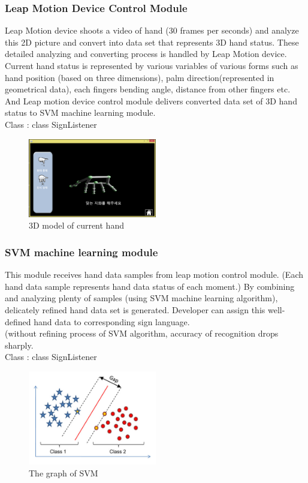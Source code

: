 \documentclass[10pt,journal,compsoc]{IEEEtran}
\begin{document}
\subsubsection{Leap Motion Device Control Module\\}

Leap Motion device shoots a video of hand (30 frames per seconds) and analyze this 2D picture and convert into data set that represents 3D hand status. These detailed analyzing and converting process is handled by Leap Motion device.
Current hand status is represented by various variables of various forms such as hand position (based on three dimensions), palm direction(represented in geometrical data), each fingers bending angle, distance from other fingers etc.
\\And Leap motion device control module delivers converted data set of 3D hand status to SVM machine learning module.
\\Class : class SignListener

\begin{figure}[H]
\centering
\includegraphics[width=0.5\textwidth]{cap_tutorial.png}
{\caption*{3D model of current hand}}
\end{figure}
\subsubsection{SVM machine learning module\\}

This module receives hand data samples from leap motion control module. (Each hand data sample represents hand data status of each moment.) By combining and analyzing plenty of samples (using SVM machine learning algorithm), delicately refined hand data set is generated. Developer can assign this well-defined hand data to corresponding sign language.
\\(without refining process of SVM algorithm, accuracy of recognition drops sharply.
\\Class : class SignListener

\begin{figure}[H]
\centering
\includegraphics[width=0.5\textwidth]{SVM.jpg}
{\caption*{The graph of SVM}}
\end{figure}
\end{document}
